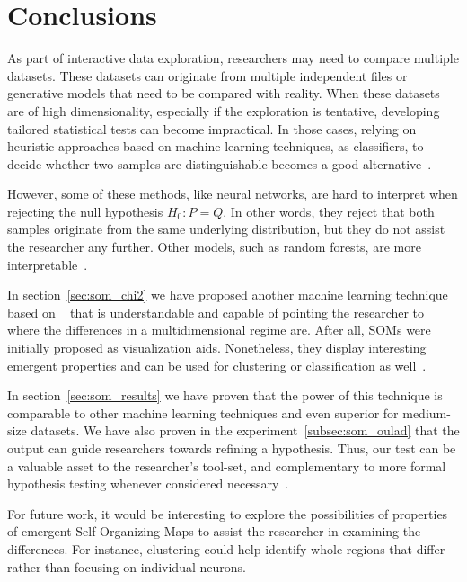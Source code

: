 \section{Conclusions}
\label{sec:som_conclusions}
As part of interactive data exploration, researchers may need to
compare multiple datasets.
These datasets can originate from multiple independent files or
generative models that need to be compared with reality. When these
datasets are of high dimensionality, especially if the exploration is
tentative, developing tailored statistical tests can become impractical.
In those cases, relying on heuristic approaches based on machine
learning techniques, as classifiers, to decide whether two samples are
distinguishable becomes a good
alternative~\cite{friedman2004multivariate,kim2021classification}.

However, some of these methods, like neural networks, are hard to interpret
when rejecting the null hypothesis $H_0: P = Q$. In other words, they
reject that both samples originate from the same underlying distribution,
but they do not assist the researcher any further.
Other models, such as random forests, are more  interpretable~\cite{friedman2004multivariate}.

In section~\ref{sec:som_chi2} we have proposed another machine learning
technique based on ~\cite{kohonen1982self} that is
understandable and capable of pointing the researcher to where the differences
in a multidimensional regime are. After all, \glspl{SOM} were initially
proposed as visualization aids. Nonetheless, they display interesting
emergent properties and can be used for clustering or classification as
well~\cite{ultsch2007emergence}.

In section~\ref{sec:som_results} we have proven that the power of this
technique is comparable to other machine learning techniques and even
superior for medium-size datasets.
We have also proven in the experiment~\ref{subsec:som_oulad} that the
output can guide researchers towards refining a hypothesis. Thus, our
test can be a valuable asset to the researcher's tool-set, and complementary
to more formal hypothesis testing whenever considered necessary~\cite{rosenblatt2021better}.

For future work, it would be interesting to explore the possibilities of
properties of emergent Self-Organizing Maps to assist the researcher
in examining the differences.
For instance, clustering could help identify whole regions that differ
rather than focusing on individual neurons.
